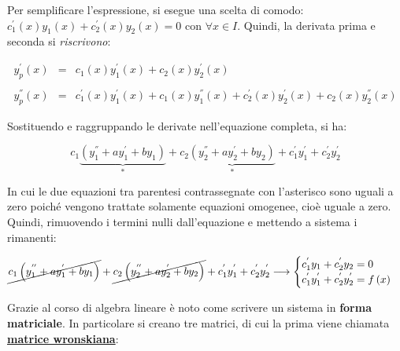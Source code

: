 \documentclass[a4paper]{article}
\begin{document}
	\noindent
	Per semplificare l'espressione, si esegue una scelta di comodo: $c_{1}^{'}\left(x\right)y_{1}\left(x\right) + c_{2}^{'}\left(x\right)y_{2}\left(x\right) = 0$ con $\forall x \in I$. Quindi, la derivata prima e seconda si \emph{riscrivono}:
	
	\begin{equation*}
		\begin{array}{lll}
			y_{p}^{'}\left(x\right)	& = & c_{1}\left(x\right)y_{1}^{'}\left(x\right) + c_{2}\left(x\right)y_{2}^{'}\left(x\right) \\
			&& \\
			y_{p}^{''}\left(x\right)& = & c_{1}^{'}\left(x\right)y_{1}^{'}\left(x\right) + c_{1}\left(x\right)y_{1}^{''}\left(x\right) + c_{2}^{'}\left(x\right)y_{2}^{'}\left(x\right) + c_{2}\left(x\right)y_{2}^{''}\left(x\right)
		\end{array}
	\end{equation*}

	\noindent
	Sostituendo e raggruppando le derivate nell'equazione completa, si ha:
	
	\begin{equation*}
		c_{1}\underbrace{\left( y_{1}^{''} + ay_{1}^{'} + by_{1} \right)}_{*} + c_{2}\underbrace{\left( y_{2}^{''} + ay_{2}^{'} + by_{2} \right)}_{*} + c_{1}^{'}y_{1}^{'} + c_{2}^{'}y_{2}^{'}
	\end{equation*}
	
	\noindent
	In cui le due equazioni tra parentesi contrassegnate con l'asterisco sono uguali a zero poiché vengono trattate solamente equazioni omogenee, cioè uguale a zero. Quindi, rimuovendo i termini nulli dall'equazione e mettendo a sistema i rimanenti:
	
	\begin{equation*}
		\cancel{c_{1}\left( y_{1}^{''} + ay_{1}^{'} + by_{1} \right)} + \cancel{c_{2}\left( y_{2}^{''} + ay_{2}^{'} + by_{2} \right)} + c_{1}^{'}y_{1}^{'} + c_{2}^{'}y_{2}^{'} \longrightarrow
		\begin{cases}
			c_{1}^{'}y_{1} + c_{2}^{'}y_{2} = 0 \\
			c_{1}^{'}y_{1}^{'} + c_{2}^{'}y_{2}^{'} = f\left(x\right)
		\end{cases}
	\end{equation*}

	\noindent
	Grazie al corso di algebra lineare è noto come scrivere un sistema in \textbf{forma matriciale}. In particolare si creano tre matrici, di cui la prima viene chiamata \textcolor{Red3}{\textbf{\underline{matrice wronskiana}}}:
	
\end{document}
